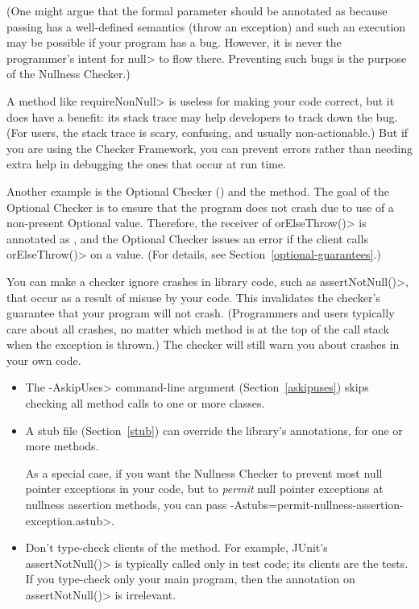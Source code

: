 (One might argue that the formal parameter should be annotated as
 because passing  has a
well-defined semantics (throw an exception) and such an execution may be
possible if your program has a bug.  However, it is never the programmer's
intent for \<null> to flow there.  Preventing such bugs is the purpose of
the Nullness Checker.)

A method like \<requireNonNull> is useless for making your code correct,
but it does have a benefit:  its stack trace may help developers to track
down the bug.  (For users, the stack trace is scary, confusing, and usually
non-actionable.)  But if you are using the Checker Framework, you can
prevent errors rather than needing extra help in debugging the ones that
occur at run time.


Another example is the Optional Checker ()
and the  method.
The goal of the Optional Checker is to ensure that the program does not
crash due to use of a non-present Optional value.  Therefore, the receiver
of
\<orElseThrow()> is annotated as
,
and the Optional Checker issues an error if the client calls
\<orElseThrow()> on a  value.
(For details, see Section~\ref{optional-guarantees}.)


You can make a checker ignore crashes in library code, such as
\<assertNotNull()>, that occur as a result of misuse by your code.
This invalidates the checker's guarantee that your program will not crash.
(Programmers and users typically care about all crashes, no matter which
method is at the top of the call stack when the exception is thrown.)
The checker will still warn you about crashes in your own code.

\begin{itemize}
\item
  The \<-AskipUses> command-line argument (Section~\ref{askipuses}) skips
  checking all method calls to one or more classes.
\item
  A stub file (Section~\ref{stub}) can override the library's annotations,
  for one or more methods.

  As a special case, if you want the Nullness Checker to prevent most null
  pointer exceptions in your code, but to \emph{permit} null pointer
  exceptions at nullness assertion methods, you can pass
  \<-Astubs=permit-nullness-assertion-exception.astub>.
\item
  Don't type-check clients of the method.  For example, JUnit's
  \<assertNotNull()> is typically called only in test code; its clients are
  the tests.  If you type-check only your main program, then the annotation
  on \<assertNotNull()> is irrelevant.
\end{itemize}


